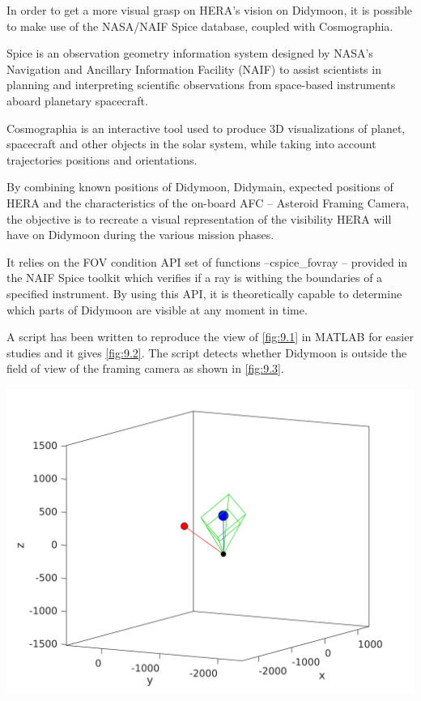In order to get a more visual grasp on HERA's vision on Didymoon, it is possible to make use of the NASA/NAIF Spice database, coupled with Cosmographia. 

Spice is an observation geometry information system designed by NASA's Navigation and Ancillary Information Facility (NAIF) to assist scientists in planning and interpreting scientific observations from space-based instruments aboard planetary spacecraft. 

Cosmographia is an interactive tool used to produce 3D visualizations of planet, spacecraft and other objects in the solar system, while taking into account trajectories positions and orientations. 

By combining known positions of Didymoon, Didymain, expected positions of HERA and the characteristics of the on-board AFC -- Asteroid Framing Camera, the objective is to recreate a visual representation of the visibility HERA will have on Didymoon during the various mission phases. 

It relies on the FOV condition API set of functions --cspice\_fovray -- provided in the NAIF Spice toolkit which verifies if a ray is withing the boundaries of a specified instrument. By using this API, it is theoretically capable to determine which parts of Didymoon are visible at any moment in time. 

A script has been written to reproduce the view of \autoref{fig:9.1} in MATLAB for easier studies and it gives \autoref{fig:9.2}. The script detects whether Didymoon is outside the field of view of the framing camera as shown in \autoref{fig:9.3}.

\begin{center}
    \includegraphics[width=0.6\linewidth]{rsc/cosmo-matlab3.png}
    \label{fig:9.3}
\end{center}

